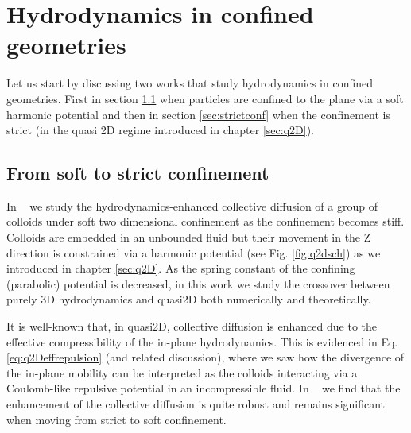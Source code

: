 \documentclass[twoside,openright,titlepage,numbers=noenddot,%
headinclude,footinclude,cleardoublepage=empty,abstract=on,
BCOR=5mm,fontsize=11pt, dvipsnames, paper=b5
]{scrreprt}
\begin{document}
\chapter{Hydrodynamics in confined geometries}

Let us start by discussing two works that study hydrodynamics in confined geometries. First in section \ref{sec:softconf} when particles are confined to the plane via a soft harmonic potential and then in section \ref{sec:strictconf} when the confinement is strict (in the quasi 2D regime introduced in chapter \ref{sec:q2D}).

\section{From soft to strict confinement}\label{sec:softconf}
In ~\cite{Pelaez2017} we study the hydrodynamics-enhanced collective diffusion of a group of colloids under soft two dimensional confinement as the confinement becomes stiff. Colloids are embedded in an unbounded fluid but their movement in the Z direction is constrained via a harmonic potential (see Fig. \ref{fig:q2dsch}) as we introduced in chapter \ref{sec:q2D}. As the spring constant of the confining (parabolic) potential is decreased, in this work we study the crossover between purely 3D hydrodynamics and quasi2D both numerically and theoretically.

It is well-known that, in quasi2D, collective diffusion is enhanced due to the effective compressibility of the in-plane hydrodynamics. This is evidenced in Eq. \eqref{eq:q2Deffrepulsion} (and related discussion), where we saw how the divergence of the in-plane mobility can be interpreted as the colloids interacting via a Coulomb-like repulsive potential in an incompressible fluid. In ~\cite{Pelaez2017} we find that the enhancement of the collective diffusion is quite robust and remains significant when moving from strict to soft confinement.
\end{document}
